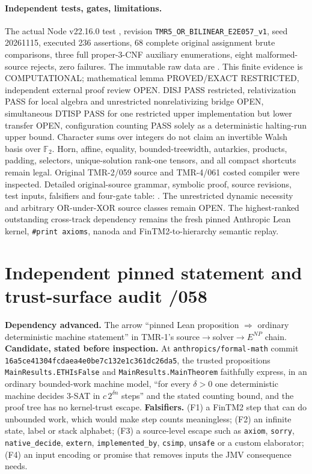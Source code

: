 \documentclass[11pt]{article}
\begin{document}
\paragraph{Independent tests, gates, limitations.}
The actual Node v22.16.0 test
,
revision \texttt{TMR5\_OR\_BILINEAR\_E2E057\_v1},
seed 20261115, executed 236 assertions, 68 complete original
assignment brute comparisons, three full proper-\(3\)-CNF auxiliary
enumerations, eight malformed-source rejects, zero failures.
The immutable raw data are
.
This finite evidence is COMPUTATIONAL; mathematical lemma PROVED/EXACT
RESTRICTED, independent external proof review OPEN.
DISJ PASS restricted, relativization PASS for local algebra and
unrestricted nonrelativizing bridge OPEN, simultaneous DTISP PASS
for one restricted upper implementation but lower transfer OPEN,
configuration counting PASS solely as a deterministic halting-run
upper bound. Character sums over integers do not claim an invertible
Walsh basis over \(\mathbb F_2\). Horn, affine, equality,
bounded-treewidth, autarkies, products, padding, selectors,
unique-solution rank-one tensors, and all compact shortcuts remain legal.
Original TMR-2/059 source and TMR-4/061 costed compiler
were inspected. Detailed original-source grammar, symbolic proof,
source revisions, test inputs, falsifiers and four-gate table:
.
The unrestricted dynamic necessity and arbitrary OR-under-XOR
source classes remain OPEN. The highest-ranked outstanding
cross-track dependency remains the fresh pinned Anthropic Lean
kernel, \texttt{\#print axioms}, nanoda and FinTM2-to-hierarchy
semantic replay.

\section{Independent pinned statement and trust-surface audit /058}
\textbf{Dependency advanced.} The arrow ``pinned Lean proposition
\(\Rightarrow\) ordinary deterministic machine statement'' in TMR-1's
source\(\to\)solver\(\to\)\(E^{NP}\) chain.
\textbf{Candidate, stated before inspection.} At
\texttt{anthropics/formal-math} commit
\texttt{16a5ce41304fcdaea4e0be7c132e1c361dc26da5}, the trusted
propositions \texttt{MainResults.ETHIsFalse} and
\texttt{MainResults.MainTheorem} faithfully express, in an ordinary
bounded-work machine model, ``for every \(\delta>0\) one deterministic
machine decides 3-SAT in \(c\,2^{\delta n}\) steps'' and the stated
counting bound, and the proof tree has no kernel-trust escape.
\textbf{Falsifiers.} (F1) a FinTM2 step that can do unbounded work,
which would make step counts meaningless; (F2) an infinite state,
label or stack alphabet; (F3) a source-level escape such as
\texttt{axiom}, \texttt{sorry}, \texttt{native\_decide},
\texttt{extern}, \texttt{implemented\_by}, \texttt{csimp},
\texttt{unsafe} or a custom elaborator; (F4) an input encoding or
promise that removes inputs the JMV consequence needs.
\end{document}

